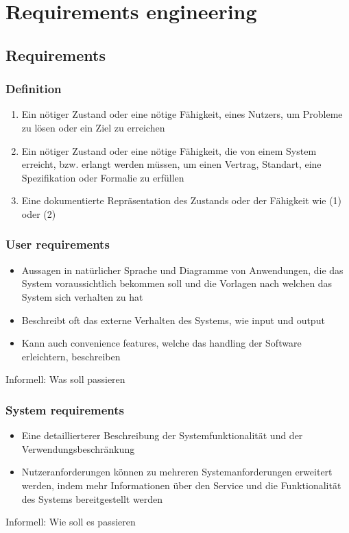 \section{Requirements engineering}
\subsection{Requirements}
\subsubsection{Definition}
\begin{enumerate}
	\item Ein nötiger Zustand oder eine nötige Fähigkeit, eines Nutzers, um Probleme zu lösen oder ein Ziel zu erreichen
	\item Ein nötiger Zustand oder eine nötige Fähigkeit, die von einem System erreicht, bzw. erlangt werden müssen, um einen Vertrag, Standart, eine Spezifikation oder Formalie zu erfüllen
	\item Eine dokumentierte Repräsentation des Zustands oder der Fähigkeit wie (1) oder (2)
\end{enumerate}
\subsubsection{User requirements}
\begin{itemize}
	\item Aussagen in natürlicher Sprache und Diagramme von Anwendungen, die das System voraussichtlich bekommen soll und die Vorlagen nach welchen das System sich verhalten zu hat 
	\item Beschreibt oft das externe Verhalten des Systems, wie input und output
	\item Kann auch convenience features, welche das handling der Software erleichtern, beschreiben
\end{itemize}
Informell: Was soll passieren
\subsubsection{System requirements}
\begin{itemize}
	\item Eine detaillierterer Beschreibung der Systemfunktionalität und der Verwendungsbeschränkung
	\item Nutzeranforderungen können zu mehreren Systemanforderungen erweitert werden, indem mehr Informationen über den Service und die Funktionalität des Systems bereitgestellt werden
\end{itemize}
Informell: Wie soll es passieren
